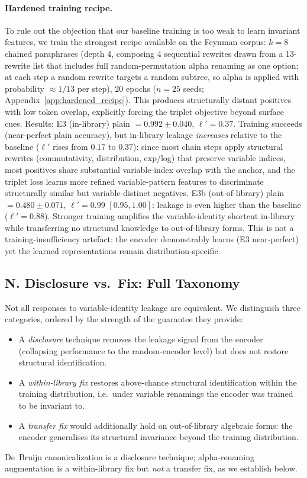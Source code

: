 \paragraph{Hardened training recipe.} To rule out the objection that our baseline training is too weak to learn invariant features, we train the strongest recipe available on the Feynman corpus: $k{=}8$ chained paraphrases (depth 4, composing 4 sequential rewrites drawn from a 13-rewrite list that includes full random-permutation alpha renaming as one option; at each step a random rewrite targets a random subtree, so alpha is applied with probability ${\approx}1/13$ per step), 20 epochs ($n{=}25$ seeds; Appendix~\ref{app:hardened_recipe}). This produces structurally distant positives with low token overlap, explicitly forcing the triplet objective beyond surface cues. Results: E3 (in-library) plain $= 0.992 \pm 0.040$, $\ell'{=}0.37$. Training succeeds (near-perfect plain accuracy), but in-library leakage \emph{increases} relative to the baseline ($\ell'$ rises from $0.17$ to $0.37$): since most chain steps apply structural rewrites (commutativity, distribution, exp/log) that preserve variable indices, most positives share substantial variable-index overlap with the anchor, and the triplet loss learns more refined variable-pattern features to discriminate structurally similar but variable-distinct negatives. E3b (out-of-library) plain $= 0.480 \pm 0.071$, $\ell'{=}0.99$ $[0.95, 1.00]$: leakage is even higher than the baseline ($\ell'{=}0.88$). Stronger training amplifies the variable-identity shortcut in-library while transferring no structural knowledge to out-of-library forms. This is not a training-insufficiency artefact: the encoder demonstrably learns (E3 near-perfect) yet the learned representations remain distribution-specific.

\subsection*{N. Disclosure vs.\ Fix: Full Taxonomy}
\label{sec:alpha_rename}

Not all responses to variable-identity leakage are equivalent. We distinguish three categories, ordered by the strength of the guarantee they provide:
\begin{itemize}[noitemsep]
  \item A \emph{disclosure} technique removes the leakage signal from the encoder (collapsing performance to the random-encoder level) but does not restore structural identification.
  \item A \emph{within-library fix} restores above-chance structural identification within the training distribution, i.e.\ under variable renamings the encoder was trained to be invariant to.
  \item A \emph{transfer fix} would additionally hold on out-of-library algebraic forms: the encoder generalises its structural invariance beyond the training distribution.
\end{itemize}
De~Bruijn canonicalization is a disclosure technique; alpha-renaming augmentation is a within-library fix but \emph{not} a transfer fix, as we establish below.

